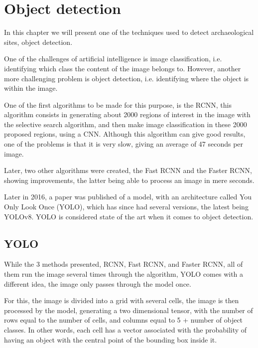 

\chapter{Object detection}

\begin{introduction}
In this chapter we will present one of the techniques used to detect archaeological sites, object detection.
\end{introduction}

One of the challenges of artificial intelligence is image classification, i.e. identifying which class the content of the image belongs to. However, another more challenging problem is object detection, i.e. identifying where the object is within the image.

One of the first algorithms to be made for this purpose, is the RCNN, this algorithm consists in generating about 2000 regions of interest in the image with the selective search algorithm, and then make image classification in these 2000 proposed regions, using a CNN. Although this algorithm can give good results, one of the problems is that it is very slow, giving an average of 47 seconds per image. 

Later, two other algorithms were created, the Fast RCNN and the Faster RCNN, showing improvements, the latter being able to process an image in mere seconds.

Later in 2016, a paper was published of a model, with an architecture called You Only Look Once (YOLO), which has since had several versions, the latest being YOLOv8.
YOLO is considered state of the art when it comes to object detection.




\section{YOLO}
While the 3 methods presented, RCNN, Fast RCNN, and Faster RCNN, all of them run the image several times through the algorithm, YOLO comes with a different idea, the image only passes through the model once.

For this, the image is divided into a grid\cite{yolodeepdive} with several cells, the image is then processed by the model, generating a two dimensional tensor, with the number of rows equal to the number of cells, and columns equal to 5 + number of object classes. In other words, each cell has a vector associated with the probability of having an object with the central point of the bounding box inside it.


